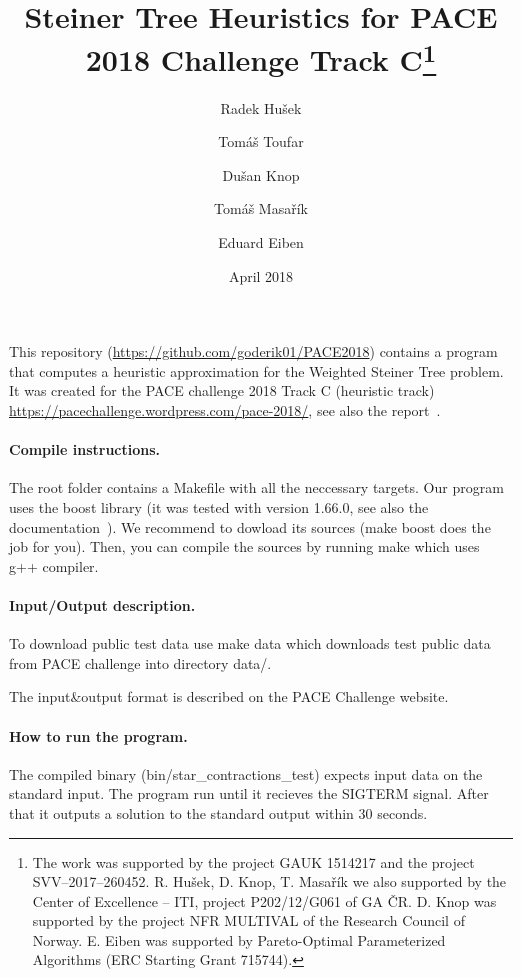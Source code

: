 \documentclass[review,a4paper]{article}
\begin{document}
\title{Steiner Tree Heuristics for PACE 2018 Challenge Track C\thanks{%
    The work was supported by the project GAUK 1514217 and the project SVV–2017–260452. R. Hušek, D. Knop, T. Masařík we also supported by the Center of Excellence – ITI, project P202/12/G061 of GA ČR. D. Knop was supported by the project NFR MULTIVAL of the Research Council of Norway. E. Eiben was supported by Pareto-Optimal Parameterized Algorithms (ERC Starting Grant 715744).
}}
\author[1]{Radek Hušek} 
\author[1]{Tomáš Toufar}
\author[2]{Dušan Knop}
\author[3]{Tomáš Masařík}
\author[2]{Eduard Eiben}




\date{April 2018}

\maketitle

This repository (\url{https://github.com/goderik01/PACE2018}) contains a program that computes a heuristic approximation for the Weighted Steiner Tree problem. It was created for the PACE challenge 2018 Track C (heuristic track) \url{https://pacechallenge.wordpress.com/pace-2018/}, see also the report~\cite{report}.

\paragraph{Compile instructions.}
The root folder contains a Makefile with all the neccessary targets. Our program uses the boost library (it was tested with version 1.66.0, see also the documentation~\cite{boost}). We recommend to dowload its sources (make boost does the job for you). Then, you can compile the sources by running make which uses g++ compiler.

\paragraph{Input/Output description.}
To download public test data use make data which downloads test public data from PACE challenge into directory data/.

The input\&output format is described on the PACE Challenge website.

\paragraph{How to run the program.}
The compiled binary (bin/star\_contractions\_test) expects input data on the standard input. The program run until it recieves the SIGTERM signal. After that it outputs a solution to the standard output within 30 seconds.
\end{document}
